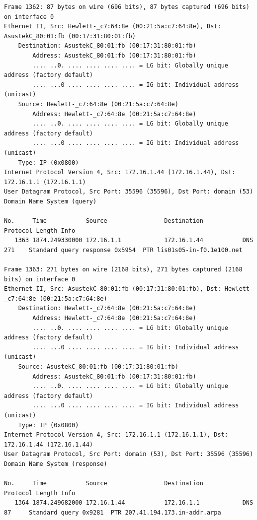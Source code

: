 \documentclass[a4paper,11pt]{article}
\begin{document}
\begin{lstlisting}
Frame 1362: 87 bytes on wire (696 bits), 87 bytes captured (696 bits) on interface 0
Ethernet II, Src: Hewlett-_c7:64:8e (00:21:5a:c7:64:8e), Dst: AsustekC_80:01:fb (00:17:31:80:01:fb)
    Destination: AsustekC_80:01:fb (00:17:31:80:01:fb)
        Address: AsustekC_80:01:fb (00:17:31:80:01:fb)
        .... ..0. .... .... .... .... = LG bit: Globally unique address (factory default)
        .... ...0 .... .... .... .... = IG bit: Individual address (unicast)
    Source: Hewlett-_c7:64:8e (00:21:5a:c7:64:8e)
        Address: Hewlett-_c7:64:8e (00:21:5a:c7:64:8e)
        .... ..0. .... .... .... .... = LG bit: Globally unique address (factory default)
        .... ...0 .... .... .... .... = IG bit: Individual address (unicast)
    Type: IP (0x0800)
Internet Protocol Version 4, Src: 172.16.1.44 (172.16.1.44), Dst: 172.16.1.1 (172.16.1.1)
User Datagram Protocol, Src Port: 35596 (35596), Dst Port: domain (53)
Domain Name System (query)

No.     Time           Source                Destination           Protocol Length Info
   1363 1874.249330000 172.16.1.1            172.16.1.44           DNS      271    Standard query response 0x5954  PTR lis01s05-in-f0.1e100.net

Frame 1363: 271 bytes on wire (2168 bits), 271 bytes captured (2168 bits) on interface 0
Ethernet II, Src: AsustekC_80:01:fb (00:17:31:80:01:fb), Dst: Hewlett-_c7:64:8e (00:21:5a:c7:64:8e)
    Destination: Hewlett-_c7:64:8e (00:21:5a:c7:64:8e)
        Address: Hewlett-_c7:64:8e (00:21:5a:c7:64:8e)
        .... ..0. .... .... .... .... = LG bit: Globally unique address (factory default)
        .... ...0 .... .... .... .... = IG bit: Individual address (unicast)
    Source: AsustekC_80:01:fb (00:17:31:80:01:fb)
        Address: AsustekC_80:01:fb (00:17:31:80:01:fb)
        .... ..0. .... .... .... .... = LG bit: Globally unique address (factory default)
        .... ...0 .... .... .... .... = IG bit: Individual address (unicast)
    Type: IP (0x0800)
Internet Protocol Version 4, Src: 172.16.1.1 (172.16.1.1), Dst: 172.16.1.44 (172.16.1.44)
User Datagram Protocol, Src Port: domain (53), Dst Port: 35596 (35596)
Domain Name System (response)

No.     Time           Source                Destination           Protocol Length Info
   1364 1874.249682000 172.16.1.44           172.16.1.1            DNS      87     Standard query 0x9281  PTR 207.41.194.173.in-addr.arpa


\end{lstlisting}
\end{document}
